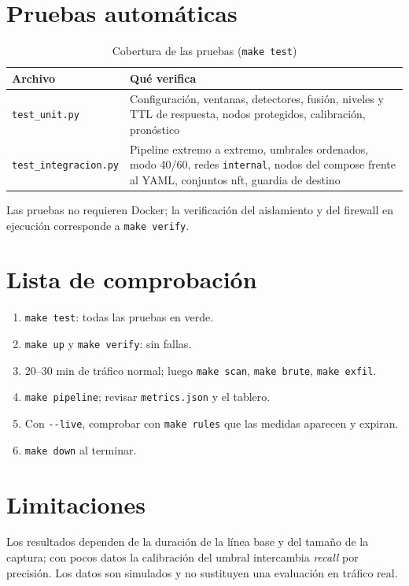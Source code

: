\documentclass[conference,onecolumn]{IEEEtran}
\newcommand{\cmd}[1]{\texttt{#1}}
\begin{document}
\section{Pruebas automáticas}
\begin{table}[htbp]
\centering
\caption{Cobertura de las pruebas (\cmd{make test})}
\label{tab:tests}
\footnotesize
\begin{tabular}{@{}lp{5.4cm}@{}}
\toprule
Archivo & Qué verifica \\
\midrule
\cmd{test\_unit.py} & Configuración, ventanas, detectores, fusión, niveles y TTL de respuesta, nodos protegidos, calibración, pronóstico \\
\cmd{test\_integracion.py} & Pipeline extremo a extremo, umbrales ordenados, modo 40/60, redes \cmd{internal}, nodos del compose frente al YAML, conjuntos nft, guardia de destino \\
\bottomrule
\end{tabular}
\end{table}
Las pruebas no requieren Docker; la verificación del aislamiento y del firewall en ejecución corresponde a \cmd{make verify}.

\section{Lista de comprobación}
\begin{enumerate}
\item \cmd{make test}: todas las pruebas en verde.
\item \cmd{make up} y \cmd{make verify}: sin fallas.
\item 20--30 min de tráfico normal; luego \cmd{make scan}, \cmd{make brute}, \cmd{make exfil}.
\item \cmd{make pipeline}; revisar \cmd{metrics.json} y el tablero.
\item Con \cmd{{-}{-}live}, comprobar con \cmd{make rules} que las medidas aparecen y expiran.
\item \cmd{make down} al terminar.
\end{enumerate}

\section{Limitaciones}
Los resultados dependen de la duración de la línea base y del tamaño de la captura; con pocos datos la calibración del umbral intercambia \emph{recall} por precisión. Los datos son simulados y no sustituyen una evaluación en tráfico real.
\end{document}
